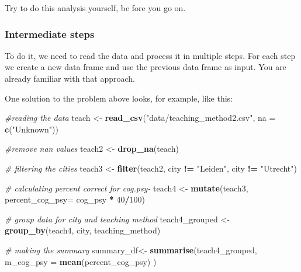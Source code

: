 \documentclass[
]{scrartcl}
\makeatletter
\newenvironment{Shaded}{\begin{snugshade}}{\end{snugshade}}
\newcommand{\CommentTok}[1]{\textcolor[rgb]{0.56,0.35,0.01}{\textit{#1}}}
\newcommand{\DataTypeTok}[1]{\textcolor[rgb]{0.13,0.29,0.53}{#1}}
\newcommand{\DecValTok}[1]{\textcolor[rgb]{0.00,0.00,0.81}{#1}}
\newcommand{\KeywordTok}[1]{\textcolor[rgb]{0.13,0.29,0.53}{\textbf{#1}}}
\newcommand{\NormalTok}[1]{#1}
\newcommand{\OperatorTok}[1]{\textcolor[rgb]{0.81,0.36,0.00}{\textbf{#1}}}
\newcommand{\StringTok}[1]{\textcolor[rgb]{0.31,0.60,0.02}{#1}}
\newenvironment{kframe}{%
\medskip{}
\setlength{\fboxsep}{.8em}
 \def\at@end@of@kframe{}%
 \ifinner\ifhmode%
  \def\at@end@of@kframe{\end{minipage}}%
  \begin{minipage}{\columnwidth}%
 \fi\fi%
 \def\FrameCommand##1{\hskip\@totalleftmargin \hskip-\fboxsep
 \colorbox{shadecolor}{##1}\hskip-\fboxsep
     \hskip-\linewidth \hskip-\@totalleftmargin \hskip\columnwidth}%
 \MakeFramed {\advance\hsize-\width
   \@totalleftmargin\z@ \linewidth\hsize
   \@setminipage}}%
 {\par\unskip\endMakeFramed%
 \at@end@of@kframe}
\newenvironment{rmdblock}[1]
  {
  \begin{itemize}
  \renewcommand{\labelitemi}{
    \raisebox{-.7\height}[0pt][0pt]{
      {\setkeys{Gin}{width=3em,keepaspectratio}\texttt{[image: images/\#1]}}
    }
  }
  \setlength{\fboxsep}{1em}
  \begin{kframe}
  \item
  }
  {
  \end{kframe}
  \end{itemize}
  }
\newenvironment{myexercise}
    {\begin{rmdblock}{exercise_green}}
    {\end{rmdblock}}
\makeatother
\begin{document}
\begin{myexercise}
Try to do this analysis yourself, be fore you go on.
\end{myexercise}

\hypertarget{intermediatesteps}{%
\subsubsection{Intermediate steps}\label{intermediatesteps}}

To do it, we need to read the data and process it in multiple steps. For each step we create a new data frame and use the previous data frame as input. You are already familiar with that approach.

One solution to the problem above looks, for example, like this:

\begin{Shaded}
\begin{Highlighting}[]
\CommentTok{\#reading the data}
\NormalTok{teach \textless{}{-}}\StringTok{ }\KeywordTok{read\_csv}\NormalTok{(}\StringTok{"data/teaching\_method2.csv"}\NormalTok{, }\DataTypeTok{na =} \KeywordTok{c}\NormalTok{(}\StringTok{"Unknown"}\NormalTok{))}
\end{Highlighting}
\end{Shaded}

\begin{Shaded}
\begin{Highlighting}[]
\CommentTok{\#remove nan values}
\NormalTok{teach2 \textless{}{-}}\StringTok{ }\KeywordTok{drop\_na}\NormalTok{(teach)}

\CommentTok{\# filtering the cities}
\NormalTok{teach3 \textless{}{-}}\StringTok{ }\KeywordTok{filter}\NormalTok{(teach2, city }\OperatorTok{!=}\StringTok{ "Leiden"}\NormalTok{, city }\OperatorTok{!=}\StringTok{ "Utrecht"}\NormalTok{)}

\CommentTok{\# calculating percent correct for cog.psy{-}}
\NormalTok{teach4 \textless{}{-}}\StringTok{ }\KeywordTok{mutate}\NormalTok{(teach3, }\DataTypeTok{percent\_cog\_psy=}\NormalTok{ cog\_psy }\OperatorTok{*}\StringTok{ }\DecValTok{40}\OperatorTok{/}\DecValTok{100}\NormalTok{)}

\CommentTok{\# group data for city and teaching method}
\NormalTok{teach4\_grouped \textless{}{-}}\StringTok{ }\KeywordTok{group\_by}\NormalTok{(teach4, city, teaching\_method)}

\CommentTok{\# making the summary}
\NormalTok{summary\_df\textless{}{-}}\StringTok{ }\KeywordTok{summarise}\NormalTok{(teach4\_grouped,}
                        \DataTypeTok{m\_cog\_psy =} \KeywordTok{mean}\NormalTok{(percent\_cog\_psy) )}
\end{Highlighting}
\end{Shaded}
\end{document}
